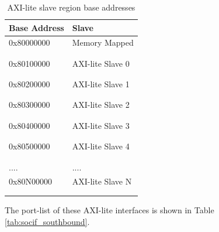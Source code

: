 \begin{table}[hbt!]
\caption{AXI-lite slave region base addresses}
\centering
\begin{tabular}{|l|l|}
\toprule
Base Address  & Slave   \\
\midrule
	\hline0x80000000 & Memory Mapped  \\
	  &   \\
	 &  \\
	\hline 0x80100000& AXI-lite Slave 0 \\
	  &   \\
	&  \\
	\hline 0x80200000 & AXI-lite Slave 1 \\
	  &   \\
	 &  \\
	\hline 0x80300000& AXI-lite Slave 2 \\
	  &   \\
	 &  \\
	\hline 0x80400000 & AXI-lite Slave 3 \\
	  &   \\
	 &  \\
	\hline 0x80500000& AXI-lite Slave 4 \\
	 &   \\
	 &  \\
	\hline .... & .... \\
	\hline 0x80N00000 & AXI-lite Slave N\\
	  &   \\
	 &  \\
\bottomrule
\end{tabular}
\label{tab:slv_addr_space}
\end{table}

The port-list of these AXI-lite interfaces is shown in Table \ref{tab:socif_southbound}.  


